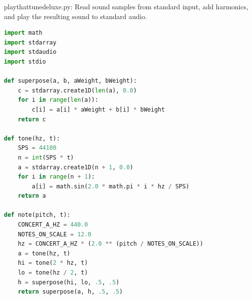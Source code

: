 \documentclass[8pt,a4paper,compress]{beamer}
\begin{document}
\begin{frame}[fragile]
\pause

\begin{framed}
\tiny playthattunedeluxe.py: Read sound samples from standard input, add harmonics, and play the resulting sound to standard audio.
\end{framed}

\begin{lstlisting}[language=Python]
import math
import stdarray
import stdaudio
import stdio

def superpose(a, b, aWeight, bWeight):
    c = stdarray.create1D(len(a), 0.0)
    for i in range(len(a)):
        c[i] = a[i] * aWeight + b[i] * bWeight
    return c

def tone(hz, t):
    SPS = 44100
    n = int(SPS * t)
    a = stdarray.create1D(n + 1, 0.0)
    for i in range(n + 1):
        a[i] = math.sin(2.0 * math.pi * i * hz / SPS)
    return a

def note(pitch, t):
    CONCERT_A_HZ = 440.0
    NOTES_ON_SCALE = 12.0
    hz = CONCERT_A_HZ * (2.0 ** (pitch / NOTES_ON_SCALE))
    a = tone(hz, t)
    hi = tone(2 * hz, t)
    lo = tone(hz / 2, t)
    h = superpose(hi, lo, .5, .5)
    return superpose(a, h, .5, .5)
\end{lstlisting}
\end{frame}
\end{document}
